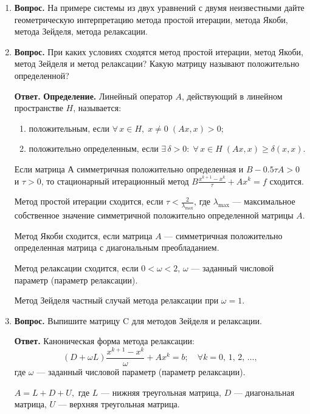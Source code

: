 \documentclass[12pt, a4paper]{article}
\begin{document}
\begin{enumerate}
		\item  \textbf{Вопрос.} На примере системы из двух уравнений с двумя неизвестными дайте геометрическую интерпретацию метода простой итерации, метода Якоби, метода Зейделя, метода релаксации.
		
	\item  \textbf{Вопрос.} При каких условиях сходятся метод простой итерации, метод Якоби, метод Зейделя и метод релаксации? Какую матрицу называют положительно определенной?
	
	\textbf{Ответ.}
	 \textbf{Определение.} Линейный оператор $ A $, действующий в линейном пространстве $ H $, называется:
	\begin{enumerate}
		\item положительным, если $ \forall \, x \in H, \; x \ne 0 \; (Ax,x) > 0; $
		\item положительно определенным, если $ \exists \, \delta > 0: \; \forall \, x \in H \; (Ax,x) \geq \delta (x,x)$.
	\end{enumerate}
\medskip

Если матрица $ А $ симметричная положительно определенная и $ B - 0.5\tau A > 0$ и $\tau > 0 $, то стационарный итерационный метод $ B \frac{x^{k + 1} - x^k}{\tau}+A x^k = f $ сходится.

Метод простой итерации сходится, если $ \tau < \frac{2}{\lambda_{\text{max}}} $, где $\lambda_{\text{max}}$ --- максимальное собственное значение симметричной положительно определенной матрицы $A$.

 Метод Якоби сходится, если матрица $A$ --- симметричная положительно определенная матрица с диагональным преобладанием.
 
 Метод релаксации сходится, если $ 0 < \omega < 2 $, $\omega$ --- заданный числовой параметр (параметр релаксации).
 
  Метод Зейделя частный случай метода релаксации при $ \omega = 1 $.
  
  	\item  \textbf{Вопрос.}	Выпишите матрицу C для методов Зейделя и релаксации.
  	
  \textbf{Ответ.}	Каноническая форма метода релаксации:
  	$$	\left( D + \omega L \right) \frac{x^{k + 1} - x^k}{\omega} + A x^k = b;\quad \forall k = 0,\, 1,\, 2,\, \dots,$$ где $\omega$ --- заданный числовой параметр (параметр релаксации).
  	
  	 $ A = L + D + U,$ где $L$ --- нижняя треугольная матрица, $D$ --- диагональная матрица, $U$ --- верхняя треугольная матрица.
  	

\end{enumerate}
\end{document}
